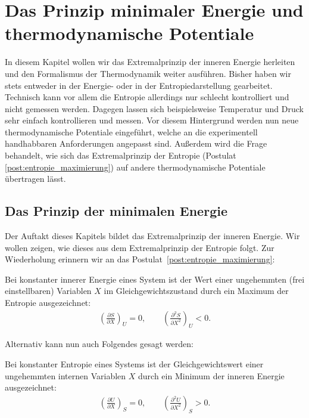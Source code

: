 

\chapter{Das Prinzip minimaler Energie und thermodynamische Potentiale}

In diesem Kapitel wollen wir das Extremalprinzip der inneren Energie herleiten und den Formalismus der Thermodynamik weiter ausführen.
Bisher haben wir stets entweder in der Energie- oder in der Entropiedarstellung gearbeitet. Technisch kann vor allem die Entropie allerdings nur schlecht kontrolliert und nicht gemessen werden. Dagegen lassen sich beispielsweise Temperatur und Druck sehr einfach kontrollieren und messen. Vor diesem Hintergrund werden nun neue thermodynamische Potentiale eingeführt, welche an die experimentell handhabbaren Anforderungen angepasst sind.
Außerdem wird die Frage behandelt, wie sich das Extremalprinzip der Entropie (Postulat \ref{post:entropie_maximierung}) auf andere thermodynamische Potentiale übertragen lässt.


\section{Das Prinzip der minimalen Energie}

Der Auftakt dieses Kapitels bildet das Extremalprinzip der inneren Energie. Wir wollen zeigen, wie dieses aus dem Extremalprinzip der Entropie folgt.
Zur Wiederholung erinnern wir an das Postulat~\ref{post:entropie_maximierung}:
\begin{formal}
    Bei konstanter innerer Energie eines System ist der Wert einer ungehemmten (frei einstellbaren) Variablen $X$ im Gleichgewichtszustand durch ein Maximum der Entropie ausgezeichnet:
    \begin{align}
        \label{eq:Entropiemaximum}
        \left( \frac{\partial S}{\partial X}  \right)_U = 0, \qquad \left( \frac{\partial ^2S}{\partial X^2}  \right)_U < 0.
    \end{align}
\end{formal}

Alternativ kann nun auch Folgendes gesagt werden:

\begin{formal}
    Bei konstanter Entropie eines Systems ist der Gleichgewichtswert einer ungehemmten internen Variablen $X$ durch ein Minimum der inneren Energie ausgezeichnet:
    \begin{align*}
        \left( \frac{\partial U}{\partial X}  \right)_S = 0, \qquad \left( \frac{\partial ^2U}{\partial X^2}  \right)_S > 0.
    \end{align*}
\end{formal}

